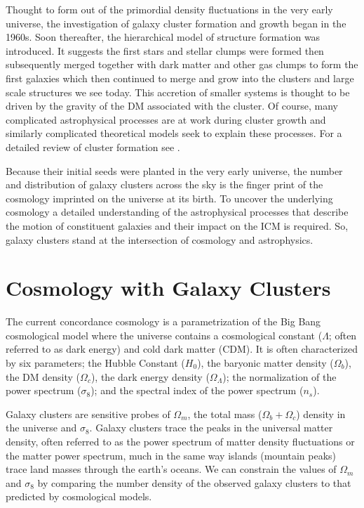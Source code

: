 Thought to form out of the primordial density fluctuations in the very early universe, the investigation of galaxy cluster formation and growth began in the 1960s. Soon thereafter, the hierarchical model of structure formation \citep{Press1974, Gott1975, White1978} was introduced. It suggests the first stars and stellar clumps were formed then subsequently merged together with dark matter and other gas clumps to form the first galaxies which then continued to merge and grow into the clusters and large scale structures we see today. This accretion of smaller systems is thought to be driven by the gravity of the DM associated with the cluster. Of course, many complicated astrophysical processes are at work during cluster growth and similarly complicated theoretical models seek to explain these processes. For a detailed review of cluster formation see \cite{Kravtsov2012}.

Because their initial seeds were planted in the very early universe, the number and distribution of galaxy clusters across the sky is the finger print of the cosmology imprinted on the universe at its birth. To uncover the underlying cosmology a detailed understanding of the astrophysical processes that describe the motion of constituent galaxies and their impact on the ICM is required. So, galaxy clusters stand at the intersection of cosmology and astrophysics. 

\section{Cosmology with Galaxy Clusters}
The current concordance cosmology is a parametrization of the Big Bang cosmological model where the universe contains a cosmological constant ($\Lambda$; often referred to as dark energy) and cold dark matter (CDM). It is often characterized by six parameters; the Hubble Constant ($H_0$), the baryonic matter density ($\Omega_b$), the DM density ($\Omega_c$), the dark energy density ($\Omega_\Lambda$); the normalization of the power spectrum ($\sigma_8$); and the spectral index of the power spectrum ($n_s$). 

Galaxy clusters are sensitive probes of $\Omega_m$, the total mass ($\Omega_b + \Omega_c$) density in the universe and $\sigma_8$. Galaxy clusters trace the peaks in the universal matter density, often referred to as the power spectrum of matter density fluctuations or the matter power spectrum, much in the same way islands (mountain peaks) trace land masses through the earth's oceans. We can constrain the values of $\Omega_m$ and $\sigma_8$ by comparing the number density of the observed galaxy clusters to that predicted by cosmological models.

